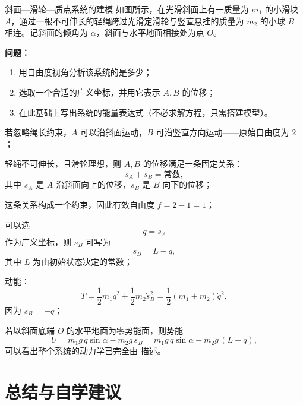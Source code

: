 \documentclass[a4paper,11pt]{ctexart}
\begin{document}
\begin{examplebox}{斜面—滑轮—质点系统的建模}
  如图所示，在光滑斜面上有一质量为 $m_1$ 的小滑块 $A$，通过一根不可伸长的轻绳跨过光滑定滑轮与竖直悬挂的质量为 $m_2$ 的小球 $B$ 相连。记斜面的倾角为 $\alpha$，斜面与水平地面相接处为点 $O$。

  \textbf{问题：}
  \begin{enumerate}
    \item 用自由度视角分析该系统的是多少；
    \item 选取一个合适的广义坐标，并用它表示 $A,B$ 的位移；
    \item 在此基础上写出系统的能量表达式（不必求解方程，只需搭建模型）。
  \end{enumerate}

  \begin{focuspoints}
    \item 若忽略绳长约束，$A$ 可以沿斜面运动，$B$ 可沿竖直方向运动——原始自由度为 $2$；
    \item 轻绳不可伸长，且滑轮理想，则 $A,B$ 的位移满足一条固定关系：
          \[
            s_A + s_B = \text{常数},
          \]
          其中 $s_A$ 是 $A$ 沿斜面向上的位移，$s_B$ 是 $B$ 向下的位移；
    \item 这条关系构成一个约束，因此有效自由度 $f = 2 - 1 = 1$；
    \item 可以选
          \[
            q = s_A
          \]
          作为广义坐标，则 $s_B$ 可写为
          \[
            s_B = L - q,
          \]
          其中 $L$ 为由初始状态决定的常数；
    \item 动能：
          \[
            T = \frac12 m_1 \dot q^2 + \frac12 m_2 \dot s_B^2
            = \frac12 (m_1 + m_2)\dot q^2,
          \]
          因为 $\dot s_B = -\dot q$；
    \item 若以斜面底端 $O$ 的水平地面为零势能面，则势能
          \[
            U = m_1 g\,q\sin\alpha - m_2 g\,s_B
              = m_1 g\,q\sin\alpha - m_2 g\,(L - q),
          \]
          可以看出整个系统的动力学已完全由 描述。
  \end{focuspoints}
\end{examplebox}

\clearpage
\section{总结与自学建议}
\end{document}
